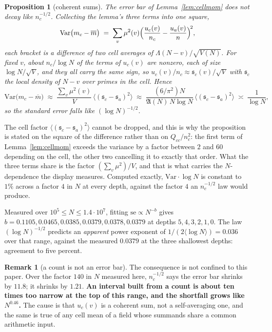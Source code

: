 \documentclass[11pt,a4paper]{article}
\theoremstyle{plain}
\newtheorem{proposition}[theorem]{Proposition}
\theoremstyle{definition}
\newtheorem{remark}[theorem]{Remark}
\newcommand{\AAA}{\mathfrak{A}}
\begin{document}
\begin{proposition}[coherent sums]\label{prop:coh}
The error bar of Lemma~\ref{lem:cellmom} does \emph{not} decay like
$n_c^{-1/2}$. Collecting the lemma's three terms into one square,
\[
  \mathrm{Var}\bigl(m_c-\overline m\bigr)
  \;=\; \sum_v \mu^2(v)
        \Bigl(\frac{u_c(v)}{n_c}-\frac{u_a(v)}{n}\Bigr)^{\!2},
\]
each bracket is a difference of two cell averages of
$\Lambda(N-v)/\sqrt{V(N)}$. For fixed $v$, about $n_c/\log N$ of the
terms of $u_c(v)$ are nonzero, each of size $\log N/\sqrt V$, and they
all carry the same sign, so $u_c(v)/n_c \approx
\mathfrak s_c(v)/\sqrt V$ with $\mathfrak s_c$ the local density of
$N-v$ over primes in the cell. Hence
\[
  \mathrm{Var}\bigl(m_c-\overline m\bigr)
  \;\approx\; \frac{\sum_v\mu^2(v)}{V}\,
     \bigl\langle(\mathfrak s_c-\mathfrak s_a)^2\bigr\rangle
  \;\approx\; \frac{(6/\pi^2)N}{\AAA(N)\,N\log N}\,
     \bigl\langle(\mathfrak s_c-\mathfrak s_a)^2\bigr\rangle
  \;\asymp\; \frac{1}{\log N},
\]
so the standard error falls like $(\log N)^{-1/2}$.
\end{proposition}

The cell factor $\langle(\mathfrak s_c-\mathfrak s_a)^2\rangle$ cannot
be dropped, and this is why the proposition is stated on the square of
the difference rather than on $Q_{cc}/n_c^2$: the first term of
Lemma~\ref{lem:cellmom} exceeds the variance by a factor between $2$
and $60$ depending on the cell, the other two cancelling it to exactly
that order. What the three terms share is the factor
$(\sum_v\mu^2)/V$, and that is what carries the $N$-dependence the
display measures. Computed exactly, $\mathrm{Var}\cdot\log N$ is
constant to $1\%$ across a factor $4$ in $N$ at every depth, against
the factor $4$ an $n_c^{-1/2}$ law would produce.

Measured over $10^5 \le N \le 1.4\cdot10^7$, fitting
$\mathrm{se}\propto N^{-b}$ gives $b = 0.1105, 0.0465, 0.0385,
0.0379, 0.0378, 0.0379$ at depths $5,4,3,2,1,0$. The law
$(\log N)^{-1/2}$ predicts an \emph{apparent} power exponent of
$1/(2\langle\log N\rangle) = 0.036$ over that range, against the
measured $0.0379$ at the three shallowest depths: agreement to five
percent.

\begin{remark}[a count is not an error bar]
The consequence is not confined to this paper. Over the factor $140$ in
$N$ measured here, $n_c^{-1/2}$ says the error bar shrinks by $11.8$;
it shrinks by $1.21$. \textbf{An interval built from a count is about
ten times too narrow at the top of this range, and the shortfall grows
like $N^{0.46}$.} The cause is that $u_c(v)$ is a coherent sum, not a
self-averaging one, and the same is true of any cell mean of a field
whose summands share a common arithmetic input.
\end{remark}
\end{document}
